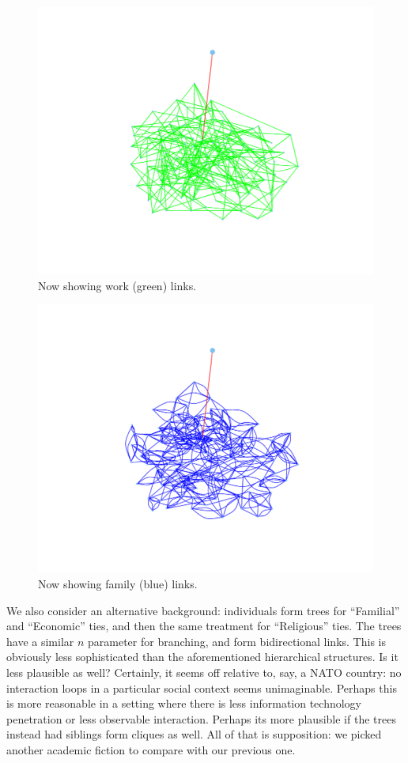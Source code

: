 \documentclass{article}
\newenvironment{rnwfig}[0]{\begin{figure}\begin{center}}{\end{center}\end{figure}}
\begin{document}
\begin{rnwfig}
\includegraphics{manuscript-work}
\caption{Now showing work (green) links.}
\end{rnwfig}

\begin{rnwfig}
\includegraphics{manuscript-family}
\caption{Now showing family (blue) links.}
\end{rnwfig}

We also consider an alternative background: individuals form trees for ``Familial'' and ``Economic'' ties, and then the same treatment for ``Religious'' ties.  The trees have a similar $n$ parameter for branching, and form bidirectional links.  This is obviously less sophisticated than the aforementioned hierarchical structures.  Is it less plausible as well?  Certainly, it seems off relative to, say, a NATO country: no interaction loops in a particular social context seems unimaginable.  Perhaps this is more reasonable in a setting where there is less information technology penetration or less observable interaction.  Perhaps its more plausible if the trees instead had siblings form cliques as well.  All of that is supposition: we picked another academic fiction to compare with our previous one.
\end{document}
